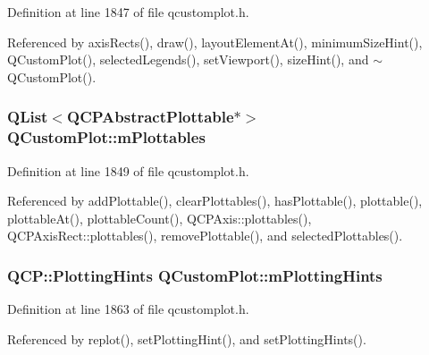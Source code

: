 Definition at line 1847 of file qcustomplot.\+h.



Referenced by axis\+Rects(), draw(), layout\+Element\+At(), minimum\+Size\+Hint(), Q\+Custom\+Plot(), selected\+Legends(), set\+Viewport(), size\+Hint(), and $\sim$\+Q\+Custom\+Plot().

\hypertarget{class_q_custom_plot_a62bf8e4e7f8d23fc1e9301ba0148269f}{}
\subsubsection[{m\+Plottables}]{\setlength{\rightskip}{0pt plus 5cm}Q\+List$<${\bf Q\+C\+P\+Abstract\+Plottable}$\ast$$>$ Q\+Custom\+Plot\+::m\+Plottables\hspace{0.3cm}{\ttfamily [protected]}}\label{class_q_custom_plot_a62bf8e4e7f8d23fc1e9301ba0148269f}


Definition at line 1849 of file qcustomplot.\+h.



Referenced by add\+Plottable(), clear\+Plottables(), has\+Plottable(), plottable(), plottable\+At(), plottable\+Count(), Q\+C\+P\+Axis\+::plottables(), Q\+C\+P\+Axis\+Rect\+::plottables(), remove\+Plottable(), and selected\+Plottables().

\hypertarget{class_q_custom_plot_aa184197a6101a9cc5807469e1d006c9e}{}
\subsubsection[{m\+Plotting\+Hints}]{\setlength{\rightskip}{0pt plus 5cm}Q\+C\+P\+::\+Plotting\+Hints Q\+Custom\+Plot\+::m\+Plotting\+Hints\hspace{0.3cm}{\ttfamily [protected]}}\label{class_q_custom_plot_aa184197a6101a9cc5807469e1d006c9e}


Definition at line 1863 of file qcustomplot.\+h.



Referenced by replot(), set\+Plotting\+Hint(), and set\+Plotting\+Hints().

\hypertarget{class_q_custom_plot_ab30daeca6612c3948afd368dce5f1c39}{}
